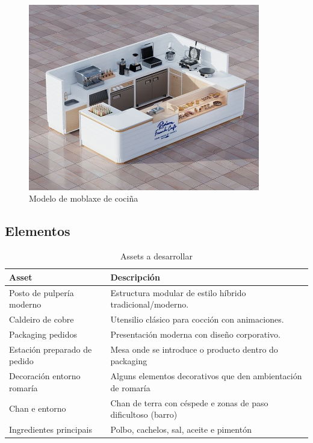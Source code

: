 \documentclass{report}  %
\begin{document}
\begin{figure}[h]
    \centering
    \includegraphics[width=0.9\textwidth]{images/kitchen_furniture_concept_1.jpg}
    \caption{Modelo de moblaxe de cociña}
    \label{fig:Modelo de moblaxe de cociña}
\end{figure}

\clearpage


\subsection{Elementos}

\begin{table}[h]
    \centering
    \renewcommand{\arraystretch}{1.3}
    \setlength{\tabcolsep}{10pt}
    \label{tab:assets}
    \begin{tabular}{|p{4cm}|p{9cm}|}
        \hline
        \rowcolor{octopus}
        \textbf{Asset} & \textbf{Descripción} \\
        \hline
        Posto de pulpería moderno & Estructura modular de estilo híbrido tradicional/moderno. \\
        \hline
        Caldeiro de cobre & Utensilio clásico para cocción con animaciones. \\
        \hline
        Packaging pedidos & Presentación moderna con diseño corporativo. \\
        \hline
        Estación preparado de pedido & Mesa onde se introduce o producto dentro do packaging \\
        \hline
        Decoración entorno romaría & Alguns elementos decorativos que den ambientación de romaría \\
        \hline
        Chan e entorno & Chan de terra con céspede e zonas de paso dificultoso (barro) \\
        \hline
        Ingredientes principais & Polbo, cachelos, sal, aceite e pimentón \\
        \hline
    \end{tabular}
    \caption{Assets a desarrollar}
\end{table}
\end{document}
